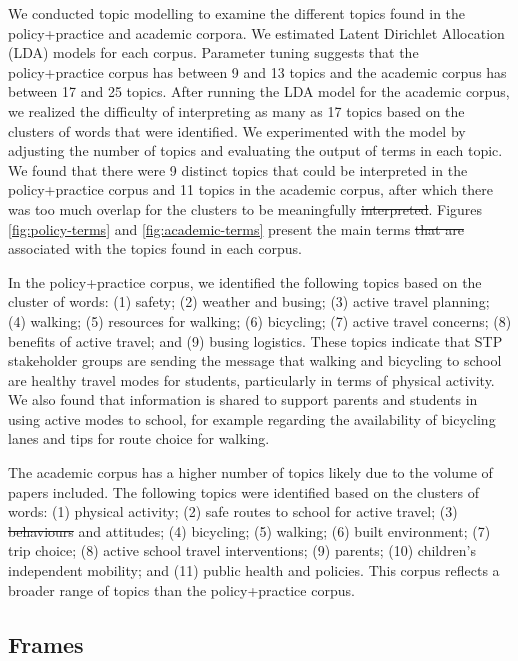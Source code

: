 \documentclass[preprint, 3p,
authoryear]{elsarticle} %
\providecommand{\DIFaddtex}[1]{{\protect\color{blue}\uwave{#1}}} %
\providecommand{\DIFdeltex}[1]{{\protect\color{red}\sout{#1}}}                      %
\providecommand{\DIFaddbegin}{} %
\providecommand{\DIFaddend}{} %
\providecommand{\DIFdelbegin}{} %
\providecommand{\DIFdelend}{} %
\providecommand{\DIFadd}[1]{\texorpdfstring{\DIFaddtex{#1}}{#1}} %
\providecommand{\DIFdel}[1]{\texorpdfstring{\DIFdeltex{#1}}{}} %
\newcommand{\DIFscaledelfig}{0.5}
\newlength{\DIFdelgraphicswidth} %
\newlength{\DIFdelgraphicsheight} %
\newcommand{\DIFaddincludegraphics}[2][]{{\color{blue}\fbox{\DIFOincludegraphics[#1]{#2}}}} %
\newcommand{\DIFdelincludegraphics}[2][]{%
\sbox{\DIFdelgraphicsbox}{\DIFOincludegraphics[#1]{#2}}%
\settoboxwidth{\DIFdelgraphicswidth}{\DIFdelgraphicsbox} %
\settoboxtotalheight{\DIFdelgraphicsheight}{\DIFdelgraphicsbox} %
\scalebox{\DIFscaledelfig}{%
\parbox[b]{\DIFdelgraphicswidth}{\usebox{\DIFdelgraphicsbox}\\[-\baselineskip] \rule{\DIFdelgraphicswidth}{0em}}\llap{\resizebox{\DIFdelgraphicswidth}{\DIFdelgraphicsheight}{%
\setlength{\unitlength}{\DIFdelgraphicswidth}%
\begin{picture}(1,1)%
\thicklines\linethickness{2pt} %
{\color[rgb]{1,0,0}\put(0,0){\framebox(1,1){}}}%
{\color[rgb]{1,0,0}\put(0,0){\line( 1,1){1}}}%
{\color[rgb]{1,0,0}\put(0,1){\line(1,-1){1}}}%
\end{picture}%
}\hspace*{3pt}}} %
} %
\DeclareRobustCommand{\DIFaddbegin}{\DIFOaddbegin \let\includegraphics\DIFaddincludegraphics} %
\DeclareRobustCommand{\DIFaddend}{\DIFOaddend \let\includegraphics\DIFOincludegraphics} %
\DeclareRobustCommand{\DIFdelbegin}{\DIFOdelbegin \let\includegraphics\DIFdelincludegraphics} %
\DeclareRobustCommand{\DIFdelend}{\DIFOaddend \let\includegraphics\DIFOincludegraphics} %
\begin{document}
We conducted topic modelling to examine the different topics found in
the policy+practice and academic corpora. We estimated Latent Dirichlet
Allocation (LDA) models for each corpus. Parameter tuning suggests that
the policy+practice corpus has between 9 and 13 topics and the academic
corpus has between 17 and 25 topics. After running the LDA model for the
academic corpus, we realized the difficulty of interpreting as many as
17 topics based on the clusters of words that were identified. We
experimented with the model by adjusting the number of topics and
evaluating the output of terms in each topic. We found that there were 9
distinct topics that could be interpreted in the policy+practice corpus
and 11 topics in the academic corpus, after which there was too much
overlap for the clusters to be meaningfully \DIFdelbegin \DIFdel{interpreted}\DIFdelend \DIFaddbegin \DIFadd{distinguished}\DIFaddend . Figures
\ref{fig:policy-terms} and \ref{fig:academic-terms} present the main
terms \DIFdelbegin \DIFdel{that are }\DIFdelend associated with the topics found in each corpus.

In the policy+practice corpus, we identified the following topics based
on the cluster of words: (1) safety; (2) weather and busing; (3) active
travel planning; (4) walking; (5) resources for walking; (6) bicycling;
(7) active travel concerns; (8) benefits of active travel; and (9)
busing logistics. These topics indicate that STP stakeholder groups are
sending the message that walking and bicycling to school are healthy
travel modes for students, particularly in terms of physical activity.
We also found that information is shared to support parents and students
in using active modes to school, for example regarding the availability
of bicycling lanes and tips for route choice for walking.

The academic corpus has a higher number of topics likely due to the
volume of papers included. The following topics were identified based on
the clusters of words: (1) physical activity; (2) safe routes to school
for active travel; (3) \DIFdelbegin \DIFdel{behaviours }\DIFdelend \DIFaddbegin \DIFadd{behaviors }\DIFaddend and attitudes; (4) bicycling; (5)
walking; (6) built environment; (7) trip choice; (8) active school
travel interventions; (9) parents; (10) children's independent mobility;
and (11) public health and policies. This corpus reflects a broader
range of topics than the policy+practice corpus.

\hypertarget{frames}{%
\subsection{Frames}\label{frames}}
\end{document}
